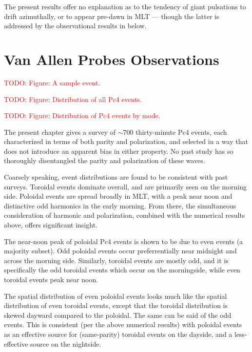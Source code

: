 \documentclass{article}
\newcommand{\about}{\ensuremath{\sim}}
\newcommand{\todo}[1]{ \textcolor{red}{TODO: #1} }
\begin{document}
The present results offer no explanation as to the tendency of giant
pulsations to drift azimuthally, or to appear pre-dawn in MLT --- though
the latter is addressed by the observational results in below.


\section{Van Allen Probes Observations}

\todo{Figure: A sample event.}

\todo{Figure: Distribution of all Pc4 events.}

\todo{Figure: Distribution of Pc4 events by mode.}

The present chapter gives a survey of \about700 thirty-minute Pc4
events, each characterized in terms of both parity and polarization, and
selected in a way that does not introduce an apparent bias in either
property. No past study has so thoroughly disentangled the parity and
polarization of these waves.

Coarsely speaking, event distributions are found to be consistent with
past surveys. Toroidal events dominate overall, and are primarily seen
on the morning side. Poloidal events are spread broadly in MLT, with a
peak near noon and distinctive odd harmonics in the early morning. From
there, the simultaneous consideration of harmonic and polarization,
combined with the numerical results above, offers significant insight.

The near-noon peak of poloidal Pc4 events is shown to be due to even
events (a majority subset). Odd poloidal events occur preferrentially
near midnight and across the morning side. Similarly, toroidal events
are mostly odd, and it is specifically the odd toroidal events which
occur on the morningside, while even toroidal events peak near noon.

The spatial distribution of even poloidal events looks much like the
spatial distribution of even toroidal events, except that the toroidal
distribution is skewed dayward compared to the poloidal. The same can be
said of the odd events. This is consistent (per the above numerical
results) with poloidal events as an effective source for (same-parity)
toroidal events on the dayside, and a less-effective source on the
nightside.
\end{document}
